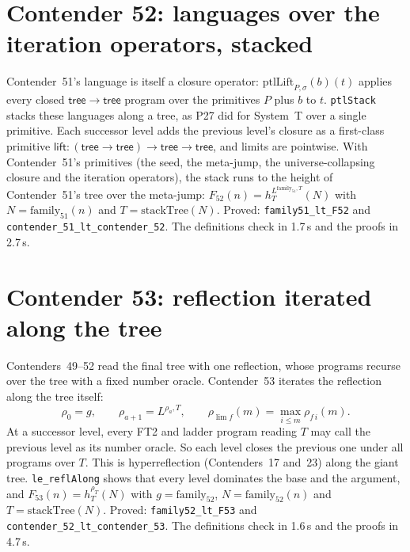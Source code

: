 \documentclass[11pt]{article}
\theoremstyle{definition}
\theoremstyle{remark}
\newcommand{\lean}[1]{\texttt{#1}}
\begin{document}
\section{Contender 52: languages over the iteration operators, stacked}

Contender~51's language is itself a closure operator:
$\mathrm{ptlLift}_{P,\sigma}(b)(t)$ applies every closed
$\mathsf{tree}\to\mathsf{tree}$ program over the primitives $P$ plus $b$ to $t$.
\lean{ptlStack} stacks these languages along a tree, as P27 did for System~T
over a single primitive. Each successor level adds the previous level's
closure as a first-class primitive
$\mathsf{lift}:(\mathsf{tree}\to\mathsf{tree})\to\mathsf{tree}\to\mathsf{tree}$,
and limits are pointwise. With Contender~51's primitives (the seed, the
meta-jump, the universe-collapsing closure and the iteration operators), the
stack runs to the height of Contender~51's tree over the meta-jump:
$F_{52}(n)=h^{L^{\mathrm{family}_{51},T}}_T(N)$ with $N=\mathrm{family}_{51}(n)$ and
$T=\mathrm{stackTree}(N)$. Proved: \lean{family51\_lt\_F52} and
\lean{contender\_51\_lt\_\allowbreak contender\_52}. The definitions check in
1.7\,s and the proofs in 2.7\,s.

\section{Contender 53: reflection iterated along the tree}

Contenders~49--52 read the final tree with one reflection, whose programs
recurse over the tree with a fixed number oracle. Contender~53 iterates the
reflection along the tree itself:
\[
\rho_0=g,\qquad \rho_{a+1}=L^{\rho_a,T},\qquad \rho_{\lim f}(m)=\max_{i\le m}\rho_{f\,i}(m).
\]
At a successor level, every FT2 and ladder program reading $T$ may call the
previous level as its number oracle. So each level closes the previous one
under all programs over $T$. This is hyperreflection (Contenders~17 and~23)
along the giant tree. \lean{le\_reflAlong} shows that every level dominates
the base and the argument, and
$F_{53}(n)=h^{\rho_T}_T(N)$ with $g=\mathrm{family}_{52}$,
$N=\mathrm{family}_{52}(n)$ and $T=\mathrm{stackTree}(N)$. Proved:
\lean{family52\_lt\_F53} and \lean{contender\_52\_lt\_\allowbreak contender\_53}.
The definitions check in 1.6\,s and the proofs in 4.7\,s.

\end{document}
